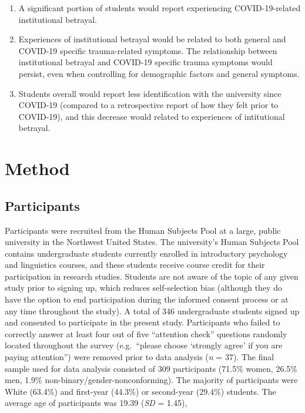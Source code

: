 \documentclass[
  english,
  man, noextraspace]{apa6}
\begin{document}
\begin{enumerate}
\def\labelenumi{\arabic{enumi}.}
\item
  A significant portion of students would report experiencing COVID-19-related institutional betrayal.
\item
  Experiences of institutional betrayal would be related to both general and COVID-19 specific trauma-related symptoms. The relationship between institutional betrayal and COVID-19 specific trauma symptoms would persist, even when controlling for demographic factors and general symptoms.
\item
  Students overall would report less identification with the university since COVID-19 (compared to a retrospective report of how they felt prior to COVID-19), and this decrease would related to experiences of intitutional betrayal.
\end{enumerate}

\setlength{\parindent}{5ex}

\hypertarget{method}{%
\section{Method}\label{method}}

\hypertarget{participants}{%
\subsection{Participants}\label{participants}}

Participants were recruited from the Human Subjects Pool at a large, public university in the Northwest United States. The university's Human Subjects Pool contains undergraduate students currently enrolled in introductory psychology and linguistics courses, and these students receive course credit for their participation in research studies. Students are not aware of the topic of any given study prior to signing up, which reduces self-selection bias (although they do have the option to end participation during the informed consent process or at any time throughout the study). A total of 346 undergraduate students signed up and consented to participate in the present study. Participants who failed to correctly answer at least four out of five \enquote{attention check} questions randomly located throughout the survey (e.g.~\enquote{please choose \enquote{strongly agree} if you are paying attention}) were removed prior to data analysis (\emph{n} = 37). The final sample used for data analysis consisted of 309 participants (71.5\% women, 26.5\% men, 1.9\% non-binary/gender-nonconforming). The majority of participants were White (63.4\%) and first-year (44.3\%) or second-year (29.4\%) students. The average age of participants was 19.39 (\emph{SD} = 1.45),
\end{document}
